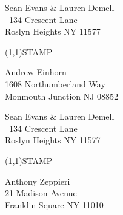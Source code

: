 \documentclass[12pt]{article}
\begin{document}
\clearpage

\begin{minipage}{.5\linewidth} \noindent
Sean Evans \& Lauren Demell\\\ 
134 Crescent Lane\\ 
Roslyn Heights NY 11577
\end{minipage}
\begin{minipage}{.5\linewidth \hspace{-.2in} \vspace{-.3in}}
\begin{flushright}
\framebox(1,1){STAMP}
\end{flushright}
\end{minipage}

\begin{center} \begin{Huge} \vspace*{\fill}
Andrew Einhorn\\
1608 Northumberland Way\\
Monmouth Junction NJ 08852\\
\vspace{\fill} \end{Huge} \end{center}

\clearpage

\begin{minipage}{.5\linewidth} \noindent
Sean Evans \& Lauren Demell\\\ 
134 Crescent Lane\\ 
Roslyn Heights NY 11577
\end{minipage}
\begin{minipage}{.5\linewidth \hspace{-.2in} \vspace{-.3in}}
\begin{flushright}
\framebox(1,1){STAMP}
\end{flushright}
\end{minipage}

\begin{center} \begin{Huge} \vspace*{\fill}
Anthony Zeppieri\\
21 Madison Avenue\\
Franklin Square NY 11010\\
\vspace{\fill} \end{Huge} \end{center}
\end{document}
